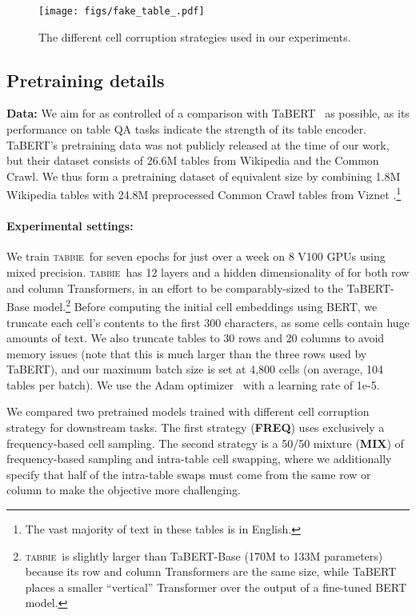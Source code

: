 \documentclass[11pt]{article}
\newcommand{\name}[0]{\textsc{tabbie}}
\newcommand{\freq}[0]{\textbf{FREQ}}
\newcommand{\mix}[0]{\textbf{MIX}}
\begin{document}
\makeatother
\begin{figure}
\centering
\texttt{[image: figs/fake\_table\_.pdf]}
  \caption{The different cell corruption strategies used in our experiments.}
  \label{fig:fake_tables}
\end{figure}
 

\subsection{Pretraining details}

\noindent\textbf{Data:}
We aim for as controlled of a comparison with TaBERT~\citep{yin20acl} as possible, as its performance on table QA tasks indicate the strength of its table encoder. TaBERT's pretraining data was not publicly released at the time of our work, but their dataset consists of 26.6M tables from Wikipedia and the Common Crawl. We thus form a pretraining dataset of equivalent size by combining 1.8M Wikipedia tables with 24.8M preprocessed Common Crawl tables from Viznet \cite{DBLP:conf/chi/HuGHBZHK0SD19}.\footnote{The vast majority of text in these tables is in English.} 

\paragraph{Experimental settings:} We train \name\ for seven epochs for just over a week on 8 V100 GPUs using mixed precision. \name\ has 12 layers and a hidden dimensionality of  for both row and column Transformers, in an effort to be comparably-sized to the TaBERT-Base model.\footnote{\name\ is slightly larger than TaBERT-Base (170M to 133M parameters) because its row and column Transformers are the same size, while TaBERT places a smaller ``vertical'' Transformer over the output of a fine-tuned BERT model.}  Before computing the initial cell embeddings using BERT, we truncate each cell's contents to the first 300 characters, as some cells contain huge amounts of text. We also truncate tables to 30 rows and 20 columns to avoid memory issues (note that this is much larger than the three rows used by TaBERT), and our maximum batch size is set at 4,800 cells (on average, 104 tables per batch). We use the Adam optimizer~\citep{kingma2014adam} with a learning rate of 1e-5.  


We compared two pretrained models trained with different cell corruption strategy for downstream tasks. The first strategy (\freq) uses exclusively a frequency-based cell sampling. The second strategy is a 50/50 mixture (\mix) of frequency-based sampling and intra-table cell swapping, where we additionally specify that half of the intra-table swaps must come from the same row or column to make the objective more challenging.
\end{document}
